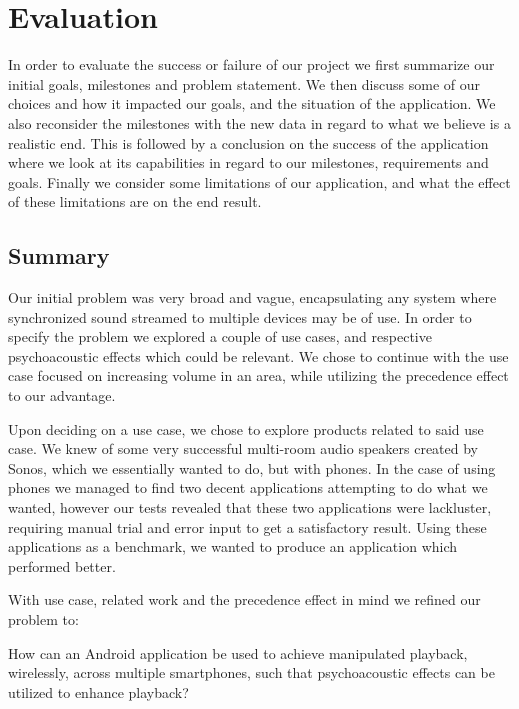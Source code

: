 \chapter{Evaluation}\label{cha:conclusion}
In order to evaluate the success or failure of our project we first summarize our initial goals, milestones and problem statement.
We then discuss some of our choices and how it impacted our goals, and the situation of the application.
We also reconsider the milestones with the new data in regard to what we believe is a realistic end.
This is followed by a conclusion on the success of the application where we look at its capabilities in regard to our milestones, requirements and goals.
Finally we consider some limitations of our application, and what the effect of these limitations are on the end result.

\section{Summary}
Our initial problem was very broad and vague, encapsulating any system where synchronized sound streamed to multiple devices may be of use.
In order to specify the problem we explored a couple of use cases, and respective psychoacoustic effects which could be relevant.
We chose to continue with the use case focused on increasing volume in an area, while utilizing the precedence effect to our advantage.

Upon deciding on a use case, we chose to explore products related to said use case.
We knew of some very successful multi-room audio speakers created by Sonos, which we essentially wanted to do, but with phones.
In the case of using phones we managed to find two decent applications attempting to do what we wanted, however our tests revealed that these two applications were lackluster, requiring manual trial and error input to get a satisfactory result.
Using these applications as a benchmark, we wanted to produce an application which performed better.

With use case, related work and the precedence effect in mind we refined our problem to:
\begin{problemstatement}
    How can an Android application be used to achieve manipulated playback, wirelessly, across multiple smartphones, such that psychoacoustic effects can be utilized to enhance playback?
\end{problemstatement}

